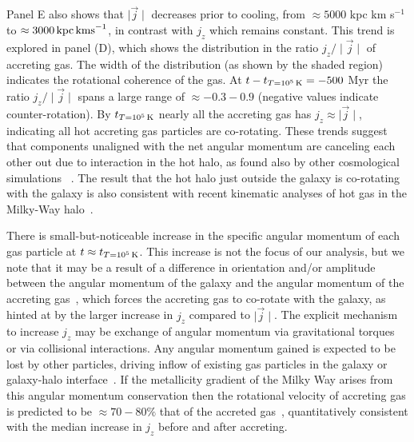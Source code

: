 \documentclass[fleqn,usenatbib]{mnras}
\newcommand{\tcon}{t_{T=10^5\,{\rm K}}}
\begin{document}
Panel E also shows that $\mid \vec j \mid$ decreases prior to cooling, from $\approx 5000$ kpc km s$^{-1}$ to $\approx 3000\,{\rm kpc\,km s}^{-1}$, in contrast with  $j_z$ which remains constant.
This trend is explored in  panel (D), which shows the distribution in the ratio $j_z/\mid\vec j\mid$ of accreting gas.
The width of the distribution (as shown by the shaded region) indicates the rotational coherence of the gas. 
At $t-\tcon=-500$ Myr the ratio $j_z/\mid\vec j\mid$ spans a large range of $\approx -0.3 - 0.9$ (negative values indicate counter-rotation).
By $\tcon$ nearly all the accreting gas has $j_z\approx\mid\vec j\mid$, indicating all hot accreting gas particles are co-rotating. 
These trends suggest that components unaligned with the net angular momentum are canceling each other out due to interaction in the hot halo, as found also by other cosmological simulations ~\citep[e.g.][]{DeFelippis2017}.
The result that the hot halo just outside the galaxy is co-rotating with the galaxy is also consistent with recent kinematic analyses of hot gas in the Milky-Way halo~\citep{Miller2016}.

There is small-but-noticeable increase in the specific angular momentum of each gas particle at $t \approx \tcon$.
This increase is not the focus of our analysis, but we note that it may be a result of a difference in orientation and/or amplitude between the angular momentum of the galaxy and the angular momentum of the accreting gas~\citep[e.g.][]{Danovich2012, DeFelippis2017, DeFelippis2020}, which forces the accreting gas to co-rotate with the galaxy, as hinted at by the larger increase in $j_z$ compared to $\mid \vec j \mid$.
The explicit mechanism to increase $j_z$ may be exchange of angular momentum via gravitational torques~\citep[e.g.][]{Danovich2015} or via collisional interactions.
Any angular momentum gained is expected to be lost by other particles, driving inflow of existing gas particles in the galaxy or galaxy-halo interface~\citep[e.g.][]{Mayor1981, Pezzulli2017}.
If the metallicity gradient of the Milky Way arises from this angular momentum conservation then the rotational velocity of accreting gas is predicted to be $\approx 70-80\%$ that of the accreted gas~\citep{Pezzulli2016a}, quantitatively consistent with the median increase in $j_z$ before and after accreting.
\end{document}

